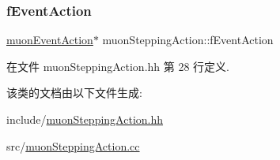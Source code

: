 \subsubsection{\texorpdfstring{f\+Event\+Action}{fEventAction}}
{\footnotesize\ttfamily \hyperlink{classmuonEventAction}{muon\+Event\+Action}$\ast$ muon\+Stepping\+Action\+::f\+Event\+Action\hspace{0.3cm}{\ttfamily [private]}}



在文件 muon\+Stepping\+Action.\+hh 第 28 行定义.



该类的文档由以下文件生成\+:\begin{DoxyCompactItemize}
\item 
include/\hyperlink{muonSteppingAction_8hh}{muon\+Stepping\+Action.\+hh}\item 
src/\hyperlink{muonSteppingAction_8cc}{muon\+Stepping\+Action.\+cc}\end{DoxyCompactItemize}
